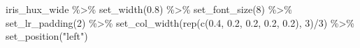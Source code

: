 \documentclass[
]{article}
\newenvironment{Shaded}{\begin{snugshade}}{\end{snugshade}}
\newcommand{\DecValTok}[1]{\textcolor[rgb]{0.00,0.00,0.81}{#1}}
\newcommand{\FloatTok}[1]{\textcolor[rgb]{0.00,0.00,0.81}{#1}}
\newcommand{\FunctionTok}[1]{\textcolor[rgb]{0.00,0.00,0.00}{#1}}
\newcommand{\NormalTok}[1]{#1}
\newcommand{\SpecialCharTok}[1]{\textcolor[rgb]{0.00,0.00,0.00}{#1}}
\newcommand{\StringTok}[1]{\textcolor[rgb]{0.31,0.60,0.02}{#1}}
\begin{document}
\begin{Shaded}
\begin{Highlighting}[]
\NormalTok{iris\_hux\_wide }\SpecialCharTok{\%\textgreater{}\%} 
      \FunctionTok{set\_width}\NormalTok{(}\FloatTok{0.8}\NormalTok{) }\SpecialCharTok{\%\textgreater{}\%} 
      \FunctionTok{set\_font\_size}\NormalTok{(}\DecValTok{8}\NormalTok{) }\SpecialCharTok{\%\textgreater{}\%} 
      \FunctionTok{set\_lr\_padding}\NormalTok{(}\DecValTok{2}\NormalTok{) }\SpecialCharTok{\%\textgreater{}\%} 
      \FunctionTok{set\_col\_width}\NormalTok{(}\FunctionTok{rep}\NormalTok{(}\FunctionTok{c}\NormalTok{(}\FloatTok{0.4}\NormalTok{, }\FloatTok{0.2}\NormalTok{, }\FloatTok{0.2}\NormalTok{, }\FloatTok{0.2}\NormalTok{, }\FloatTok{0.2}\NormalTok{), }\DecValTok{3}\NormalTok{)}\SpecialCharTok{/}\DecValTok{3}\NormalTok{) }\SpecialCharTok{\%\textgreater{}\%} 
      \FunctionTok{set\_position}\NormalTok{(}\StringTok{"left"}\NormalTok{)}
\end{Highlighting}
\end{Shaded}

 
  \providecommand{\huxb}[2]{\arrayrulecolor[RGB]{#1}\global\arrayrulewidth=#2pt}
  \providecommand{\huxvb}[2]{\color[RGB]{#1}\vrule width #2pt}
  \providecommand{\huxtpad}[1]{\rule{0pt}{#1}}
  \providecommand{\huxbpad}[1]{\rule[-#1]{0pt}{#1}}
\end{document}
